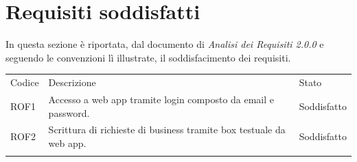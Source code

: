 \documentclass{article}
\begin{document}
\section{Requisiti soddisfatti}
In questa sezione è riportata, dal documento di \textit{Analisi dei Requisiti 2.0.0} e seguendo le convenzioni lì illustrate, il soddisfacimento dei requisiti.

\begin{center}
    \begin{tabular}{|P{2cm}| P{10cm}| P{4cm}|}
\hline
Codice & Descrizione & Stato  \\ 
\hline
ROF1 & Accesso a web app tramite login composto da email e password. & Soddisfatto \\ 
\hline
ROF2& Scrittura di richieste di business tramite box testuale da web app. & Soddisfatto\\ 


\end{tabular}
\end{center}
\end{document}
